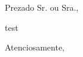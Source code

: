 \documentclass{letter}
\begin{document}
 
\begin{letter}
\opening{Prezado Sr. ou Sra.,}
 
test
\closing{Atenciosamente,}

 
\end{letter}
\end{document}
